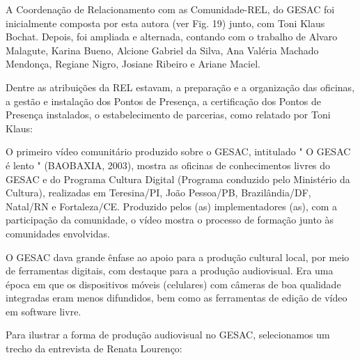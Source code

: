 A Coordenação de Relacionamento com as Comunidade-REL, do GESAC foi inicialmente composta por esta autora (ver Fig. 19) junto, com Toni Klaus Bochat. Depois, foi ampliada e alternada, contando com o trabalho de Alvaro Malagute, Karina Bueno, Alcione Gabriel da Silva, Ana Valéria Machado Mendonça, Regiane Nigro, Josiane Ribeiro e Ariane Maciel.

Dentre as atribuições da REL estavam,  a preparação e a organização das oficinas, a gestão e instalação dos Pontos de Presença, a certificação dos Pontos de Presença instalados, o estabelecimento de parcerias, como relatado por Toni Klaus:


\noindent\begin{center}\mbox{\centering{}}\end{center}


O primeiro vídeo comunitário produzido sobre o GESAC, intitulado " O GESAC é lento "  (BAOBAXIA, 2003),  mostra as oficinas de conhecimentos livres do GESAC e do Programa Cultura Digital (Programa conduzido pelo Ministério da Cultura), realizadas em Teresina/PI, João Pessoa/PB, Brazilândia/DF, Natal/RN e Fortaleza/CE. Produzido pelos (as) implementadores (as), com a participação da comunidade, o vídeo mostra o processo de formação junto às comunidades envolvidas.

O GESAC dava grande ênfase ao apoio para a produção cultural local, por meio de ferramentas digitais, com destaque para a produção audiovisual. Era uma época em que os dispositivos móveis (celulares) com câmeras de boa qualidade integradas eram menos difundidos, bem como as ferramentas de edição de vídeo em software livre.

Para ilustrar a forma de produção audiovisual no GESAC, selecionamos um trecho da entrevista de Renata Lourenço:


\noindent\begin{center}\mbox{\centering{}}\end{center}



